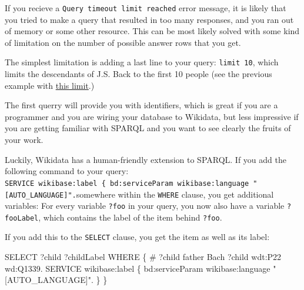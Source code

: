\documentclass[
  letterpaper,
  DIV=11,
  numbers=noendperiod]{scrreprt}
\newenvironment{Shaded}{\begin{snugshade}}{\end{snugshade}}
\newcommand{\CommentTok}[1]{\textcolor[rgb]{0.37,0.37,0.37}{#1}}
\newcommand{\NormalTok}[1]{\textcolor[rgb]{0.00,0.23,0.31}{#1}}
\newcommand{\SpecialCharTok}[1]{\textcolor[rgb]{0.37,0.37,0.37}{#1}}
\newcommand{\StringTok}[1]{\textcolor[rgb]{0.13,0.47,0.30}{#1}}
\newcounter{quartocallouttipno}
\newcommand{\quartocallouttip}[1]{\refstepcounter{quartocallouttipno}\label{#1}}
\begin{document}
\begin{tcolorbox}[enhanced jigsaw, opacityback=0, bottomrule=.15mm, rightrule=.15mm, toptitle=1mm, breakable, colbacktitle=quarto-callout-tip-color!10!white, colback=white, title=\textcolor{quarto-callout-tip-color}{\faLightbulb}\hspace{0.5em}{Tip \ref*{tip-timeout}: Query timeout limit reached}, leftrule=.75mm, toprule=.15mm, left=2mm, arc=.35mm, colframe=quarto-callout-tip-color-frame, coltitle=black, titlerule=0mm, bottomtitle=1mm, opacitybacktitle=0.6]

\quartocallouttip{tip-timeout} 

If you recieve a \texttt{Query\ timeout\ limit\ reached} error message,
it is likely that you tried to make a query that resulted in too many
responses, and you ran out of memory or some other resource. This can be
most likely solved with some kind of limitation on the number of
possible answer rows that you get.

The simplest limitation is adding a last line to your query:
\texttt{limit\ 10}, which limits the descendants of J.S. Back to the
first 10 people (see the previous example with
\href{https://query.wikidata.org/\#SELECT\%20\%3Fchild\%0AWHERE\%0A\%7B\%0A\%23\%20\%3Fchild\%20\%20father\%20\%20\%20Bach\%0A\%20\%20\%3Fchild\%20wdt\%3AP22\%20wd\%3AQ1339.\%0A\%7D\%20limit\%2010}{this
limit}.)

\end{tcolorbox}

The first querry will provide you with identifiers, which is great if
you are a programmer and you are wiring your database to Wikidata, but
less impressive if you are getting familiar with SPARQL and you want to
see clearly the fruits of your work.

Luckily, Wikidata has a human-friendly extension to SPARQL. If you add
the following command to your query:
\texttt{SERVICE\ wikibase:label\ \{\ bd:serviceParam\ wikibase:language\ "{[}AUTO\_LANGUAGE{]}".}somewhere
within the \texttt{WHERE} clause, you get additional variables: For
every variable \texttt{?foo} in your query, you now also have a variable
\texttt{?fooLabel}, which contains the label of the item behind
\texttt{?foo}.

If you add this to the \texttt{SELECT} clause, you get the item as well
as its label:

\begin{Shaded}
\begin{Highlighting}[]
\NormalTok{SELECT ?child ?childLabel}
\NormalTok{WHERE}
\NormalTok{\{}
\CommentTok{\# ?child  father   Bach}
\NormalTok{  ?child wdt}\SpecialCharTok{:}\NormalTok{P22 wd}\SpecialCharTok{:}\NormalTok{Q1339.}
\NormalTok{  SERVICE wikibase}\SpecialCharTok{:}\NormalTok{label \{ bd}\SpecialCharTok{:}\NormalTok{serviceParam wikibase}\SpecialCharTok{:}\NormalTok{language }\StringTok{"[AUTO\_LANGUAGE]"}\NormalTok{. \}}
\NormalTok{\}}
\end{Highlighting}
\end{Shaded}
\end{document}

